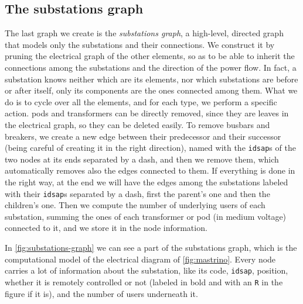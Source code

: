 \subsection{The substations graph}

The last graph we create is the \emph{substations graph}, a high-level, directed graph that models only the substations and their connections. We construct it by pruning the electrical graph of the other elements, so as to be able to inherit the connections among the substations and the direction of the power flow. In fact, a substation knows neither which are its elements, nor which substations are before or after itself, only its components are the ones connected among them. What we do is to cycle over all the elements, and for each type, we perform a specific action. \acrshort{pod}s and transformers can be directly removed, since they are leaves in the electrical graph, so they can be deleted easily. To remove busbars and breakers, we create a new edge between their predecessor and their successor (being careful of creating it in the right direction), named with the \texttt{idsap}s of the two nodes at its ends separated by a dash, and then we remove them, which automatically removes also the edges connected to them. If everything is done in the right way, at the end we will have the edges among the substations labeled with their \texttt{idsap}s separated by a dash, first the parent's one and then the children's one. Then we compute the number of underlying users of each substation, summing the ones of each transformer or \acrshort{pod} (in medium voltage) connected to it, and we store it in the node information.

In \autoref{fig:substations-graph} we can see a part of the substations graph, which is the computational model of the electrical diagram of \autoref{fig:mastrino}. Every node carries a lot of information about the substation, like its code, \texttt{idsap}, position, whether it is remotely controlled or not (labeled in bold and with an \texttt{R} in the figure if it is), and the number of users underneath it.


